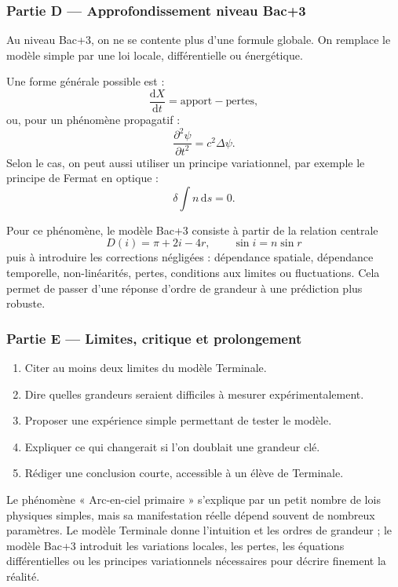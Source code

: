 \documentclass[11pt,a4paper]{article}
\begin{document}
\subsubsection*{Partie D — Approfondissement niveau Bac+3}

\begin{approfondissementbox}
Au niveau Bac+3, on ne se contente plus d'une formule globale. On remplace le modèle simple par une loi locale, différentielle ou énergétique.

Une forme générale possible est :
\[
\frac{\mathrm d X}{\mathrm dt}=\text{apport}-\text{pertes},
\]
ou, pour un phénomène propagatif :
\[
\frac{\partial^2 \psi}{\partial t^2}=c^2\Delta\psi.
\]
Selon le cas, on peut aussi utiliser un principe variationnel, par exemple le principe de Fermat en optique :
\[
\delta \int n\,\mathrm ds=0.
\]

Pour ce phénomène, le modèle Bac+3 consiste à partir de la relation centrale
\[
D(i)=\pi+2i-4r,\qquad \sin i=n\sin r
\]
puis à introduire les corrections négligées : dépendance spatiale, dépendance temporelle, non-linéarités, pertes, conditions aux limites ou fluctuations. Cela permet de passer d'une réponse d'ordre de grandeur à une prédiction plus robuste.
\end{approfondissementbox}

\subsubsection*{Partie E — Limites, critique et prolongement}

\begin{enumerate}
  \item Citer au moins deux limites du modèle Terminale.
  \item Dire quelles grandeurs seraient difficiles à mesurer expérimentalement.
  \item Proposer une expérience simple permettant de tester le modèle.
  \item Expliquer ce qui changerait si l'on doublait une grandeur clé.
  \item Rédiger une conclusion courte, accessible à un élève de Terminale.
\end{enumerate}

\begin{corrigebox}
Le phénomène « Arc-en-ciel primaire » s'explique par un petit nombre de lois physiques simples, mais sa manifestation réelle dépend souvent de nombreux paramètres. Le modèle Terminale donne l'intuition et les ordres de grandeur ; le modèle Bac+3 introduit les variations locales, les pertes, les équations différentielles ou les principes variationnels nécessaires pour décrire finement la réalité.
\end{corrigebox}
\end{document}
